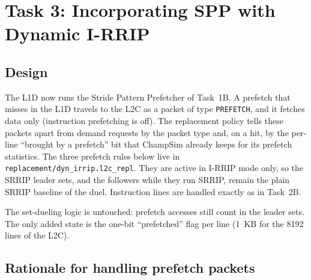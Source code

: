 \documentclass[11pt,a4paper]{article}
\begin{document}
\newpage
\section{Task 3: Incorporating SPP with Dynamic I-RRIP}
\label{sec:task3}

\subsection{Design}

The L1D now runs the Stride Pattern Prefetcher of Task~1B. A prefetch that misses in the L1D travels to the L2C as a packet of
type \texttt{PREFETCH}, and it fetches data only (instruction prefetching is off). The replacement policy tells these packets apart from
demand requests by the packet type and, on a hit, by the per-line ``brought by a prefetch'' bit that ChampSim already keeps
for its prefetch statistics. The three prefetch rules below live in \texttt{replacement/dyn\_irrip.l2c\_repl}. They are active in
I-RRIP mode only, so the SRRIP leader sets, and the followers while they run SRRIP, remain the plain SRRIP baseline of the duel.
Instruction lines are handled exactly as in Task~2B.

\begin{table}[H]
    \centering
    \caption{Handling of prefetch packets in I-RRIP mode.}
\end{table}

The set-dueling logic is untouched: prefetch accesses still count in the leader sets. The only added state is the one-bit
``prefetched'' flag per line (1~KB for the 8192 lines of the L2C).

\subsection{Rationale for handling prefetch packets}
\end{document}
